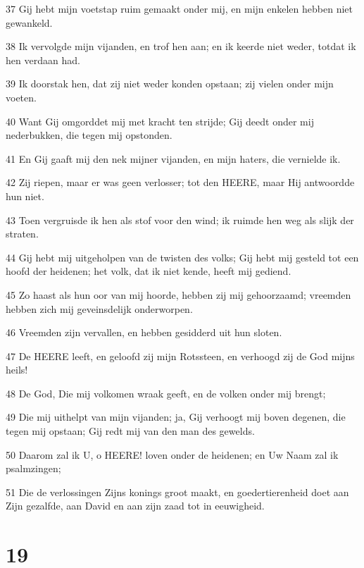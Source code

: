 \par 37 Gij hebt mijn voetstap ruim gemaakt onder mij, en mijn enkelen hebben niet gewankeld.
\par 38 Ik vervolgde mijn vijanden, en trof hen aan; en ik keerde niet weder, totdat ik hen verdaan had.
\par 39 Ik doorstak hen, dat zij niet weder konden opstaan; zij vielen onder mijn voeten.
\par 40 Want Gij omgorddet mij met kracht ten strijde; Gij deedt onder mij nederbukken, die tegen mij opstonden.
\par 41 En Gij gaaft mij den nek mijner vijanden, en mijn haters, die vernielde ik.
\par 42 Zij riepen, maar er was geen verlosser; tot den HEERE, maar Hij antwoordde hun niet.
\par 43 Toen vergruisde ik hen als stof voor den wind; ik ruimde hen weg als slijk der straten.
\par 44 Gij hebt mij uitgeholpen van de twisten des volks; Gij hebt mij gesteld tot een hoofd der heidenen; het volk, dat ik niet kende, heeft mij gediend.
\par 45 Zo haast als hun oor van mij hoorde, hebben zij mij gehoorzaamd; vreemden hebben zich mij geveinsdelijk onderworpen.
\par 46 Vreemden zijn vervallen, en hebben gesidderd uit hun sloten.
\par 47 De HEERE leeft, en geloofd zij mijn Rotssteen, en verhoogd zij de God mijns heils!
\par 48 De God, Die mij volkomen wraak geeft, en de volken onder mij brengt;
\par 49 Die mij uithelpt van mijn vijanden; ja, Gij verhoogt mij boven degenen, die tegen mij opstaan; Gij redt mij van den man des gewelds.
\par 50 Daarom zal ik U, o HEERE! loven onder de heidenen; en Uw Naam zal ik psalmzingen;
\par 51 Die de verlossingen Zijns konings groot maakt, en goedertierenheid doet aan Zijn gezalfde, aan David en aan zijn zaad tot in eeuwigheid.

\chapter{19}

